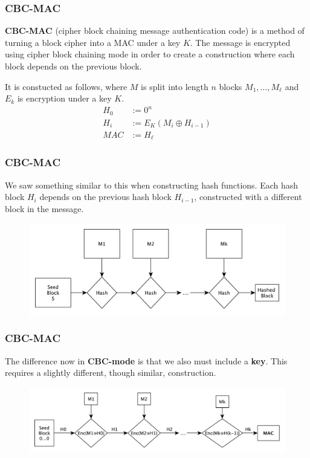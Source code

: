 \documentclass{beamer}
\newcommand{\<}{\langle}
\renewcommand{\>}{\rangle}
\begin{document}
\begin{frame}
\frametitle{CBC-MAC}

\textbf{CBC-MAC} (cipher block chaining message authentication code) is a method of turning a block cipher into a MAC under a key $K$. The message is encrypted using cipher block chaining mode in order to create a construction where each block depends on the previous block.\newline

It is constucted as follows, where $M$ is split into length $n$ blocks $M_1, \dots, M_\ell$ and $E_k$ is  encryption under a key $K$.
\begin{align*}
H_0 &:= 0^n\\
H_i &:= E_K(M_i \oplus H_{i-1}) \\
MAC &:= H_\ell
\end{align*}
\end{frame}


\begin{frame}
\frametitle{CBC-MAC}

We saw something similar to this when constructing hash functions. Each hash block $H_i$ depends on the previous hash block $H_{i-1}$, constructed with a different block in the message.
\begin{figure}
\centering
\includegraphics[scale=.5]{IMG/hash3}
\end{figure}
\end{frame}


\begin{frame}
\frametitle{CBC-MAC}

The difference now in \textbf{CBC-mode} is that we also must include a \textbf{key}. This requires a slightly different, though similar, construction.

\begin{figure}
\centering
\includegraphics[scale=.45]{IMG/CBCMACchain}
\end{figure}
\end{frame}
\end{document}
